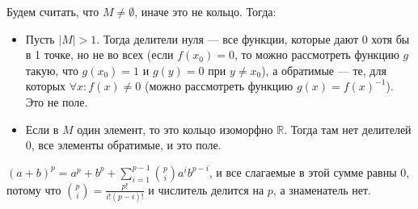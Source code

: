 \documentclass[12pt,a4paper]{article}
\begin{document}
\z Будем считать, что $M\neq\emptyset$, иначе это не кольцо. Тогда:

\begin{itemize}
	\item Пусть $|M|>1$. Тогда делители нуля --- все функции, которые дают 0 хотя бы в 1 точке, но не во всех (если $f(x_0)=0$, то можно рассмотреть функцию $g$ такую, что $g(x_0)=1$ и $g(y)=0$ при $y\neq x_0$), а обратимые --- те, для которых $\forall x:f(x)\neq 0$ (можно рассмотреть функцию $g(x)=f(x)^{-1}$). Это не поле.
	\item Если в $M$ один элемент, то это кольцо изоморфно $\mathbb R$. Тогда там нет делителей 0, все элементы обратимые, и это поле.\QEDA
\end{itemize}

\z $(a+b)^p=a^p+b^p+\sum_{i=1}^{p-1} \binom{p}{i} a^ib^{p-i}$, и все слагаемые в этой сумме равны $0$, потому что $\binom{p}{i}=\frac{p!}{i!(p-i)!}$ и числитель делится на $p$, а знаменатель нет.\QEDA\\
\end{document}
